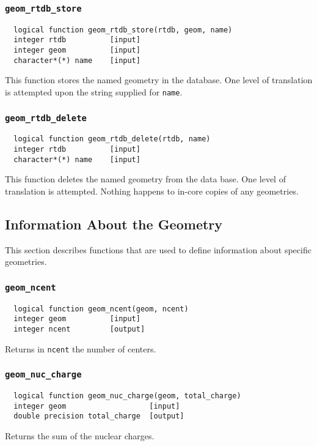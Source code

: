 \subsubsection{{\tt geom\_rtdb\_store}}
\begin{verbatim}
  logical function geom_rtdb_store(rtdb, geom, name)
  integer rtdb          [input]
  integer geom          [input]
  character*(*) name    [input]
\end{verbatim}  
This function stores the named geometry in the database.  One level of translation is
attempted upon the string supplied for \verb+name+.

\subsubsection{{\tt geom\_rtdb\_delete}}
\begin{verbatim}
  logical function geom_rtdb_delete(rtdb, name)
  integer rtdb          [input]
  character*(*) name    [input]
\end{verbatim}
This function deletes the named geometry from the data base.  One level of
translation is attempted.  Nothing happens to in-core copies of any
geometries.

\subsection{Information About the Geometry}

This section describes functions that are used to define information about specific
geometries. 

\subsubsection{{\tt geom\_ncent}}
\begin{verbatim}
  logical function geom_ncent(geom, ncent)
  integer geom          [input]
  integer ncent         [output]
\end{verbatim}
Returns in {\tt ncent} the number of centers.

\subsubsection{{\tt geom\_nuc\_charge}}
\begin{verbatim}
  logical function geom_nuc_charge(geom, total_charge)
  integer geom                   [input]
  double precision total_charge  [output]
\end{verbatim}
Returns the sum of the nuclear charges.

